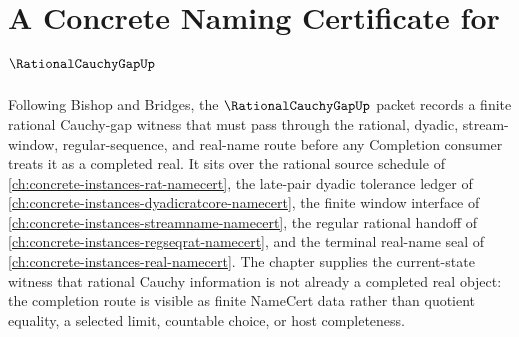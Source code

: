 \chapter{A Concrete Naming Certificate for $\RationalCauchyGapUp$}
\label{ch:concrete-instances-rational-cauchy-gap-namecert}

Following Bishop and Bridges, the $\RationalCauchyGapUp$ packet records a finite rational Cauchy-gap witness that must pass through the rational, dyadic, stream-window, regular-sequence, and real-name route before any Completion consumer treats it as a completed real. It sits over the rational source schedule of \autoref{ch:concrete-instances-rat-namecert}, the late-pair dyadic tolerance ledger of \autoref{ch:concrete-instances-dyadicratcore-namecert}, the finite window interface of \autoref{ch:concrete-instances-streamname-namecert}, the regular rational handoff of \autoref{ch:concrete-instances-regseqrat-namecert}, and the terminal real-name seal of \autoref{ch:concrete-instances-real-namecert}. The chapter supplies the current-state witness that rational Cauchy information is not already a completed real object: the completion route is visible as finite NameCert data rather than quotient equality, a selected limit, countable choice, or host completeness.

